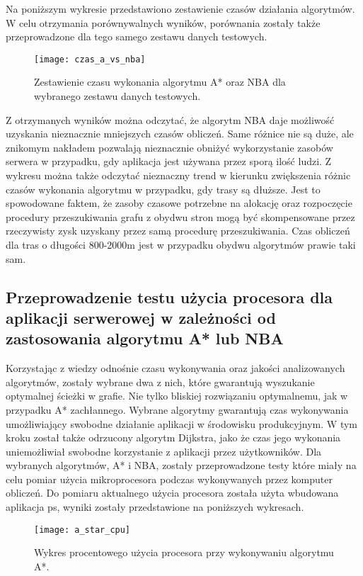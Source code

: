 Na poniższym wykresie przedstawiono zestawienie czasów działania algorytmów. W celu otrzymania porównywalnych wyników, porównania zostały także przeprowadzone dla tego samego zestawu danych testowych.

\begin{figure}[H]
\centering
\texttt{[image: czas\_a\_vs\_nba]}
\caption{Zestawienie czasu wykonania algorytmu A* oraz NBA dla wybranego zestawu danych testowych.}
\end{figure}

Z otrzymanych wyników można odczytać, że algorytm NBA daje możliwość uzyskania nieznacznie mniejszych czasów obliczeń. Same różnice nie są duże, ale znikomym nakładem pozwalają nieznacznie obniżyć wykorzystanie zasobów serwera w przypadku, gdy aplikacja jest używana przez sporą ilość ludzi. Z wykresu można także odczytać nieznaczny trend w kierunku zwiększenia różnic czasów wykonania algorytmu w przypadku, gdy trasy są dłuższe. Jest to spowodowane faktem, że zasoby czasowe potrzebne na alokację oraz rozpoczęcie procedury przeszukiwania grafu z obydwu stron mogą być skompensowane przez rzeczywisty zysk uzyskany przez samą procedurę przeszukiwania. Czas obliczeń dla tras o długości 800-2000m jest w przypadku obydwu algorytmów prawie taki sam.

\subsection{Przeprowadzenie testu użycia procesora dla aplikacji serwerowej w zależności od zastosowania algorytmu A* lub NBA}

Korzystając z wiedzy odnośnie czasu wykonywania oraz jakości analizowanych algorytmów, zostały wybrane dwa z nich, które gwarantują wyszukanie optymalnej ścieżki w grafie. Nie tylko bliskiej rozwiązaniu optymalnemu, jak w przypadku A* zachłannego. Wybrane algorytmy gwarantują czas wykonywania umożliwiający swobodne działanie aplikacji w środowisku produkcyjnym. W tym kroku został także odrzucony algorytm Dijkstra, jako że czas jego wykonania uniemożliwiał swobodne korzystanie z aplikacji przez użytkowników. Dla wybranych algorytmów, A* i NBA, zostały przeprowadzone testy które miały na celu pomiar użycia mikroprocesora podczas wykonywanych przez komputer obliczeń. Do pomiaru aktualnego użycia procesora została użyta wbudowana aplikacja ps, wyniki zostały przedstawione na poniższych wykresach.

\begin{figure}[H]
\centering
\texttt{[image: a\_star\_cpu]}
\caption{Wykres procentowego użycia procesora przy wykonywaniu algorytmu A*.}
\end{figure}

